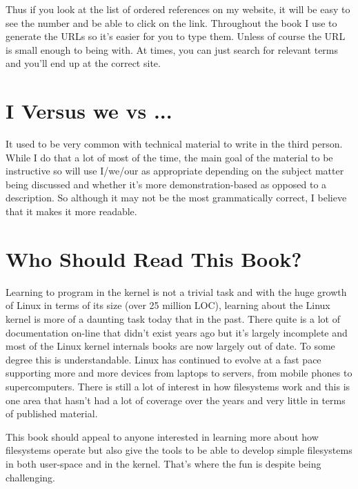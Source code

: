 \noindent
Thus if you look at the list of ordered references on my website, it will be easy to see the number and be able to click on the  link. Throughout the book I use  to generate the URLs so it's easier for you to type them. Unless of course the URL is small enough to being with. At times, you can just search for relevant terms and you'll end up at the correct site.


\section{I Versus we vs ...}

It used to be very common with technical material to write in the third person. While I do that a lot of most of the time, the main goal of the material to be instructive so will use I/we/our as appropriate depending on the subject matter being discussed and whether it's more demonstration-based as opposed to a description. So although it may not be the most grammatically correct, I believe that it makes it more readable.
 
 
\section{Who Should Read This Book?}

Learning to program in the kernel is not a trivial task and with the huge growth of Linux in terms of its size (over 25 million LOC), learning about the Linux kernel is more of a daunting task today that in the past. There quite is a lot of documentation on-line that didn't exist years ago but it's largely incomplete and most of the Linux kernel internals books are now largely out of date. To some degree this is understandable. Linux has continued to evolve at a fast pace supporting more and more devices from laptops to servers, from mobile phones to supercomputers. There is still a lot of interest in how filesystems work and this is one area that hasn't had a lot of coverage over the years and very little in terms of published material.

This book should appeal to anyone interested in learning more about how filesystems operate but also give the tools to be able to develop simple filesystems in both user-space and in the kernel. That's where the fun is despite being challenging. 

